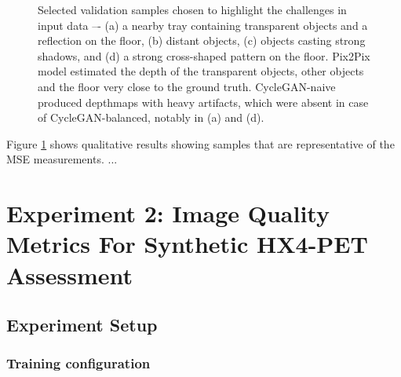 \begin{figure}[h!]
    \centering
    \caption{Selected validation samples chosen to highlight the challenges in input data –- (a) a nearby tray containing transparent objects and a reflection on the floor, (b) distant objects, (c) objects casting strong shadows, and (d) a strong cross-shaped pattern on the floor. Pix2Pix model estimated the depth of the transparent objects, other objects and the floor very close to the ground truth. CycleGAN-naive produced depthmaps with heavy artifacts, which were absent in case of CycleGAN-balanced, notably in (a) and (d).}
    \label{fig:cleargrasp_qual}
\end{figure}

Figure \ref{fig:cleargrasp_qual} shows qualitative results showing samples that are representative of the MSE measurements. ... 



\section{Experiment 2: Image Quality Metrics For Synthetic HX4-PET Assessment}
\label{Expt_2}


\subsection{Experiment Setup}

\subsubsection{Training configuration}

